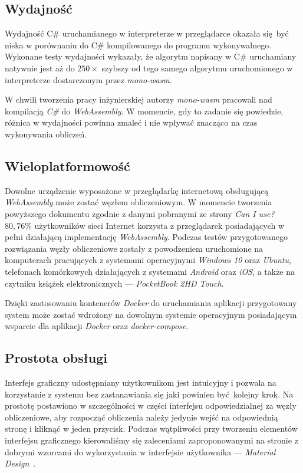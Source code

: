 \documentclass[a4paper,11pt,twoside]{report}
\theoremstyle{definition}
\begin{document}
        \subsection{Wydajność}
            Wydajność C\# uruchamianego w interpreterze w przeglądarce okazała się być niska w porównaniu do C\# kompilowanego do programu wykonywalnego.
            Wykonane testy wydajności wykazały, że algorytm napisany w C\# uruchamiany natywnie jest aż do $250\times$ szybszy od tego samego algorytmu uruchomionego w interpreterze dostarczonym przez \textit{mono-wasm}.
            
            W chwili tworzenia pracy inżynierskiej autorzy \textit{mono-wasm} pracowali nad kompilacją \textit{C\#} do \textit{WebAssembly}. W momencie, gdy to zadanie się powiedzie, różnica w wydajności powinna zmaleć i nie wpływać znacząco na czas wykonywania obliczeń.
            
        \subsection{Wieloplatformowość}
            Dowolne urządzenie wyposażone w przeglądarkę internetową obsługującą \textit{WebAssembly} może zostać węzłem obliczeniowym.
            W momencie tworzenia powyższego dokumentu zgodnie z danymi pobranymi ze strony \textit{Can I use?}~\cite{can-i-use} $80,76\%$ użytkowników sieci Internet korzysta z przeglądarek posiadających w pełni działającą implementację \textit{WebAssembly}.
            Podczas testów przygotowanego rozwiązania węzły obliczeniowe zostały z powodzeniem uruchomione na komputerach pracujących z systemami operacyjnymi \textit{Windows 10} oraz \textit{Ubuntu}, telefonach komórkowych działających z systemami \textit{Android} oraz \textit{iOS}, a także na czytniku książek elektronicznych --- \textit{PocketBook 2HD Touch}.
            
            Dzięki zastosowaniu kontenerów \textit{Docker} do uruchamiania aplikacji przygotowany system może zostać wdrożony na dowolnym systemie operacyjnym posiadającym wsparcie dla aplikacji \textit{Docker} oraz \textit{docker-compose}.
        
        \subsection{Prostota obsługi}
            Interfejs graficzny udostępniany użytkownikom jest intuicyjny i pozwala na korzystanie z systemu bez zastanawiania się jaki powinien być kolejny krok.
            Na prostotę postawiono w szczególności w części interfejsu odpowiedzialnej za węzły obliczeniowe, aby rozpocząć obliczenia należy jedynie wejść na odpowiednią stronę i kliknąć w jeden przycisk.
            Podczas wątpliwości przy tworzeniu elementów interfejsu graficznego kierowaliśmy się zaleceniami zaproponowanymi na stronie z dobrymi wzorcami do wykorzystania w interfejsie użytkownika --- \textit{Material Design}~\cite{material-design}.
        
\end{document}
